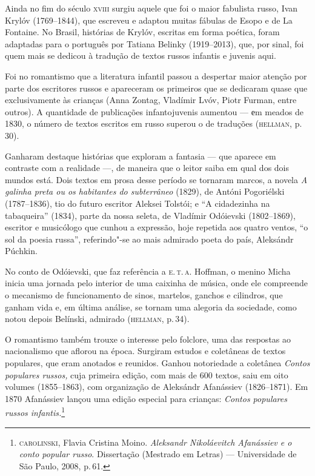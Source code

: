Ainda no fim do século \textsc{xviii} surgiu aquele que foi o maior fabulista
russo, Ivan Krylóv (1769--1844), que escreveu e adaptou muitas fábulas
de Esopo e de La Fontaine. No Brasil, histórias de Krylóv, escritas em
forma poética, foram adaptadas para o português por Tatiana Belinky
(1919--2013), que, por sinal, foi quem mais se dedicou à tradução de
textos russos infantis e juvenis aqui.

Foi no romantismo que a literatura infantil passou a despertar maior
atenção por parte dos escritores russos e apareceram os primeiros que se
dedicaram quase que exclusivamente às crianças (Anna Zontag, Vladímir
Lvóv, Piotr Furman, entre outros). A quantidade de publicações infantojuvenis aumentou
--- еm meados de 1830, o número de textos escritos em russo superou o de
traduções (\textsc{hellman}, p.\,30).

Ganharam destaque histórias que exploram a fantasia --- que aparece em
contraste com a realidade ---, de maneira que o leitor saiba em qual dos
dois mundos está. Dois textos em prosa desse período se tornaram marcos,
a novela \emph{A galinha preta ou os habitantes do subterrâneo} (1829),
de Antóni Pogoriélski (1787--1836), tio do futuro escritor Aleksei
Tolstói; e ``A cidadezinha na tabaqueira'' (1834), parte
da nossa seleta, de Vladímir Odóievski (1802--1869), escritor e
musicólogo que cunhou a expressão, hoje repetida aos quatro ventos, ``o
sol da poesia russa'', referindo"-se ao mais admirado poeta do país,
Aleksándr Púchkin.

No conto de Odóievski, que faz referência a \textsc{e.\,t.\,a.} Hoffman, o menino
Micha inicia uma jornada pelo interior de uma caixinha de música, onde
ele compreende o mecanismo de funcionamento de sinos, martelos, ganchos
e cilindros, que ganham vida e, em última análise, se tornam uma
alegoria da sociedade, como notou depois Belínski, admirado (\textsc{hellman}, p.\,34).

O romantismo também trouxe o interesse pelo folclore, uma das respostas
ao nacionalismo que aflorou na época. Surgiram estudos e coletâneas de
textos populares, que eram anotados e reunidos. Ganhou notoriedade a
coletânea \emph{Contos populares russos,} cuja primeira edição, com mais
de 600 textos, saiu em oito volumes (1855--1863), com organização de
Aleksándr Afanássiev (1826--1871). Em 1870 Afanássiev lançou uma edição
especial para crianças: \emph{Contos populares russos
infantis.}\footnote{\textsc{carolinski}, Flavia Cristina Moino. \emph{Aleksandr
  Nikoláevitch Afanássiev e o conto popular russo}. Dissertação
  (Mestrado em Letras) --- Universidade de São Paulo, 2008, p.\,61.}

